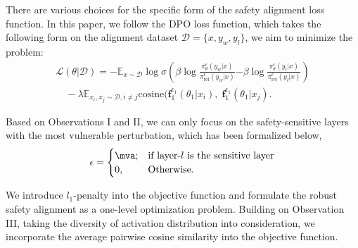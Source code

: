 


There are various choices for the specific form of the safety alignment loss function. In this paper, we follow the DPO loss function, which takes the following form on the alignment dataset $\mathcal{D}=\{x,y_w,y_l\}$, we aim to minimize the problem:
\begin{gather*}
   \mathcal{L}(\theta | \mathcal{D}) = -\mathbb{E}_{x\sim \mathcal{D}}\log \sigma \left( \beta \log \frac{\pi^{\epsilon}_{\theta}(y_w|x)}{\pi^{\epsilon}_\text{ref}(y_w|x)} \right. 
    \left. - \beta \log \frac{\pi^{\epsilon}_{\theta} (y_l|x)}{\pi^{\epsilon}_\text{{ref}} (y_l|x)} \right) \\ \quad -\lambda\mathbb{E}_{x_i, x_j\sim \mathcal{D}, i \neq j}
   \text{cosine}(\boldsymbol{f}_1^{\epsilon_1}(\theta_1|x_i), \; 
 \boldsymbol{f}_1^{\epsilon_1}(\theta_1|x_j). 
\end{gather*}


Based on Observations I and II, we can only focus on the safety-sensitive layers with the most vulnerable perturbation, which has been formalized below,
\begin{equation*}
   \epsilon = 
   \begin{cases}
       \mva; & \text{if layer-$l$ is the sensitive layer}  \\
       0, & \text{Otherwise.}
   \end{cases}
\end{equation*}

 We introduce $l_1$-penalty into the objective function and formulate the robust safety alignment as a one-level optimization problem. Building on Observation III, taking the diversity of activation distribution into consideration, we incorporate the average pairwise cosine similarity into the objective function. 






